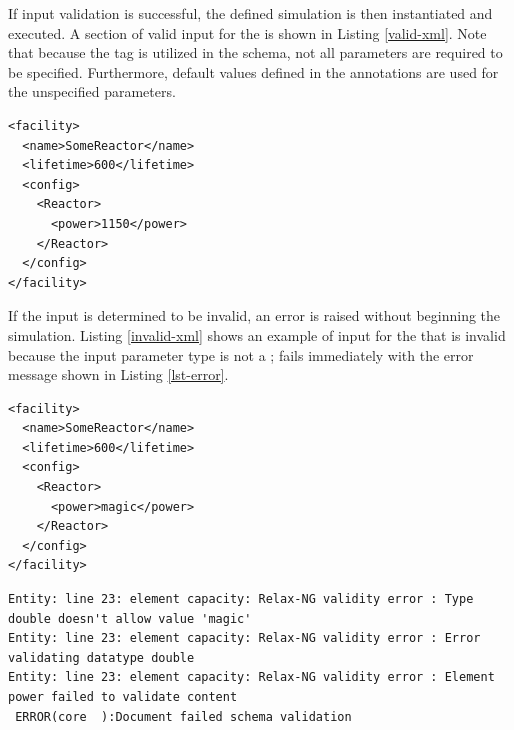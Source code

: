 If
input validation is successful, the defined simulation is then instantiated and
executed. A section of valid input for the  is shown in Listing
\ref{valid-xml}. Note that because the  tag is utilized in the
schema, not all parameters are required to be specified. Furthermore, default
values defined in the   annotations are
used for the unspecified parameters.

\lstset{language=XML}
\begin{lstlisting}[caption={A Valid Input Snippet for the Simple Reactor}, 
                   label=valid-xml]
<facility>
  <name>SomeReactor</name>
  <lifetime>600</lifetime>
  <config>
    <Reactor>
      <power>1150</power>
    </Reactor>
  </config>
</facility>
\end{lstlisting}

If the input is determined to be invalid, an error is raised without
beginning the simulation. Listing \ref{invalid-xml} shows an example of input for
the  that is invalid because the  input parameter
type is not a ; \Cyclus fails immediately with the error message
shown in Listing \ref{lst-error}.

\lstset{language=XML}
\begin{lstlisting}[caption={An Invalid Input Snippet for the Simple Reactor}, 
                   label=invalid-xml]
<facility>
  <name>SomeReactor</name>
  <lifetime>600</lifetime>
  <config>
    <Reactor>
      <power>magic</power>
    </Reactor>
  </config>
</facility>
\end{lstlisting}

\lstset{language=bash}
\begin{lstlisting}[caption={A \Cyclus Error Message from the Invalid 
      Input in Listing \ref{invalid-xml}}, 
                   label=lst-error]
Entity: line 23: element capacity: Relax-NG validity error : Type double doesn't allow value 'magic'
Entity: line 23: element capacity: Relax-NG validity error : Error validating datatype double
Entity: line 23: element capacity: Relax-NG validity error : Element power failed to validate content
 ERROR(core  ):Document failed schema validation
\end{lstlisting}

